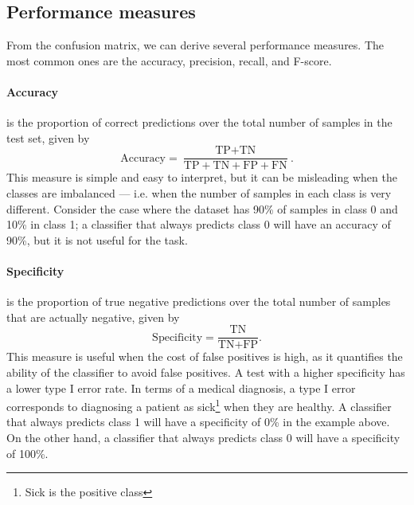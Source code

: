 \subsection{Performance measures}

From the confusion matrix, we can derive several performance measures.  The most common
ones are the accuracy, precision, recall, and F-score.

\paragraph{Accuracy} is the proportion of correct predictions over the total number of
samples in the test set, given by
\begin{equation*}
  \text{Accuracy} = \frac{\text{TP} + \text{TN}}{\text{TP} + \text{TN} + \text{FP} + \text{FN}}\text{.}
\end{equation*}
This measure is simple and easy to interpret, but it can be misleading when the classes
are imbalanced --- i.e. when the number of samples in each class is very different.
Consider the case where the dataset has 90\% of samples in class 0 and 10\% in class 1;
a classifier that always predicts class 0 will have an accuracy of 90\%, but it is not
useful for the task.

\paragraph{Specificity} is the proportion of true negative predictions over the total
number of samples that are actually negative, given by
\begin{equation*}
  \text{Specificity} = \frac{\text{TN}}{\text{TN} + \text{FP}}\text{.}
\end{equation*}
This measure is useful when the cost of false positives is high, as it quantifies the
ability of the classifier to avoid false positives.  A test with a higher specificity has
a lower type I error rate.  In terms of a medical diagnosis, a type I error corresponds to
diagnosing a patient as sick\footnote{Sick is the positive class} when they are healthy.
A classifier that always predicts class 1 will have a specificity of 0\% in the example
above.  On the other hand, a classifier that always predicts class 0 will have a specificity
of 100\%.

